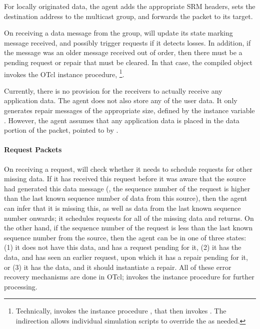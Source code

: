 For locally originated data, 
the agent adds the appropriate SRM headers,
sets the destination address to the multicast group, 
and forwards the packet to its target.

On receiving a data message from the group,
will update its state marking message  received,
and possibly trigger requests if it detects losses.
In addition, if the message was an older message received out of order,
then there must be a pending request or repair that must be cleared.
In that case, the compiled object invokes the OTcl instance procedure,
%
\footnote{Technically,
   invokes the instance procedure
  ,
  that then invokes .
  The indirection allows individual simulation scripts to override the
   as needed.}.

Currently, there is no provision for the receivers
to actually receive any application data.
The agent does not also store any of the user data.
It only generates repair messages of the appropriate size,
defined by the instance variable .
However, the agent assumes that any application data
is placed in the data portion of the packet,
pointed to by .

\paragraph{Request Packets}
On receiving a request, 
will check whether it needs to schedule requests for other missing data.
If it has received this request
before it was aware that the source had generated this data message
(\ie, the sequence number of the request is higher than 
the last known sequence number of data from this source),
then the agent can infer that it is missing this, as well as data
from the last known sequence number onwards;
it schedules requests for all of the missing data and returns.
On the other hand, if the sequence number of the request is less
than the last known sequence number from the source,
then the agent can be in one of three states:
(1) it does not have this data, and has a request pending for it,
(2) it has the data, and has seen an earlier request,
    upon which it has a repair pending for it, or
(3) it has the data, and it should instantiate a repair.
All of these error recovery mechanisms are done in OTcl;
 invokes the instance procedure
for further processing.


